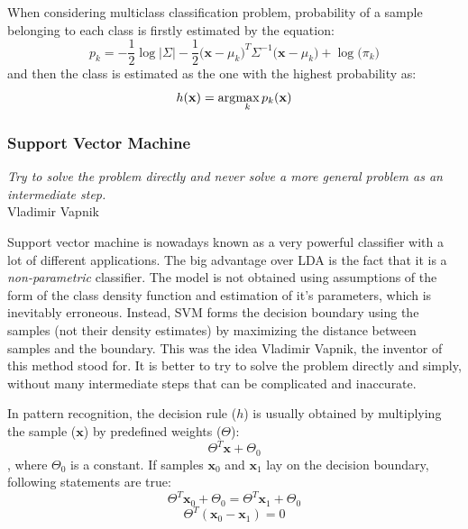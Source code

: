 When considering multiclass classification problem, probability of a sample belonging to each class is firstly estimated by the equation:
\begin{equation}
p_k = -\frac{1}{2} \log \big\vert \Sigma \big\vert - \frac{1}{2}  \Big(\mathbf{x}-\mu_k\Big)^T  \Sigma^{-1} \Big(\mathbf{x}-\mu_k\Big) +  \log{\Big(\pi_k\Big)}
\end{equation}
\noindent and then the class is estimated as the one with the highest probability as:
\begin{equation} 
h(\mathbf{x}) = \arg\!\max_k p_k(\mathbf{x})
\end{equation}


\subsubsection{Support Vector Machine}

\begin{myquote}
\begin{flushright}
\textit{Try to solve the problem directly and never solve a more general problem as an intermediate step.} \\Vladimir Vapnik
\end{flushright}
\end{myquote}


Support vector machine is nowadays known as a very powerful classifier with a lot of different applications. The big advantage over LDA is the fact that it is a \emph{non-parametric} classifier. The model is not obtained using assumptions of the form of the class density function and estimation of it's parameters, which is inevitably erroneous. Instead, SVM forms the decision boundary using the samples (not their density estimates) by maximizing the distance between samples and the boundary.
This was the idea Vladimir Vapnik, the inventor of this method stood for. It is better to try to solve the problem directly and simply, without many intermediate steps that can be complicated and inaccurate.


In pattern recognition, the decision rule ($h$) is usually obtained by multiplying the sample ($\mathbf{x}$) by predefined weights ($\Theta$):
\begin{equation} 
\Theta^T \mathbf{x} + \Theta_0
\end{equation}
\noindent , where $\Theta_0$ is a constant. If samples $\mathbf{x}_0$ and $\mathbf{x}_1$ lay on the decision boundary, following statements are true:
\begin{equation} 
\Theta^T \mathbf{x}_0 + \Theta_0 = \Theta^T \mathbf{x}_1 + \Theta_0
\end{equation}
\begin{equation} 
\Theta^T (\mathbf{x}_0 - \mathbf{x}_1) = 0
\end{equation}

